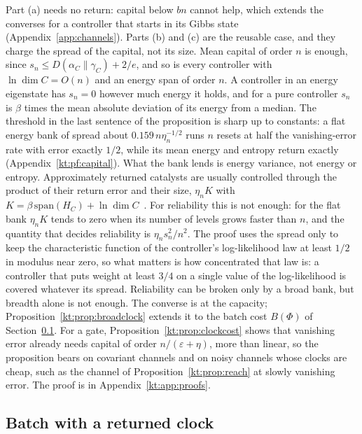 Part (a) needs no return: capital below $bn$ cannot help, which extends the converses for a controller that starts in its Gibbs state (Appendix~\ref{app:channels}). Parts (b) and (c) are the reusable case, and they charge the spread of the capital, not its size. Mean capital of order $n$ is enough, since $s_n\le D(\alpha_C\|\gamma_C)+2/e$, and so is every controller with $\ln\dim C=O(n)$ and an energy span of order $n$. A controller in an energy eigenstate has $s_n=0$ however much energy it holds, and for a pure controller $s_n$ is $\beta$ times the mean absolute deviation of its energy from a median. The threshold in the last sentence of the proposition is sharp up to constants: a flat energy bank of spread about $0.159\,n\eta_n^{-1/2}$ runs $n$ resets at half the vanishing-error rate with error exactly $1/2$, while its mean energy and entropy return exactly (Appendix~\ref{kt:pf:capital}). What the bank lends is energy variance, not energy or entropy. Approximately returned catalysts are usually controlled through the product of their return error and their size, $\eta_nK$ with $K=\beta\,\mathrm{span}(H_C)+\ln\dim C$~\cite{BrandaoSecondLaws15,NgCatalysis15}. For reliability this is not enough: for the flat bank $\eta_nK$ tends to zero when its number of levels grows faster than $n$, and the quantity that decides reliability is $\eta_ns_n^2/n^2$. The proof uses the spread only to keep the characteristic function of the controller's log-likelihood law at least $1/2$ in modulus near zero, so what matters is how concentrated that law is: a controller that puts weight at least $3/4$ on a single value of the log-likelihood is covered whatever its spread. Reliability can be broken only by a broad bank, but breadth alone is not enough. The converse is at the capacity; Proposition~\ref{kt:prop:broadclock} extends it to the batch cost $B(\Phi)$ of Section~\ref{kt:sec:batch}. For a gate, Proposition~\ref{kt:prop:clockcost} shows that vanishing error already needs capital of order $n/(\varepsilon+\eta)$, more than linear, so the proposition bears on covariant channels and on noisy channels whose clocks are cheap, such as the channel of Proposition~\ref{kt:prop:reach} at slowly vanishing error. The proof is in Appendix~\ref{kt:app:proofs}.

\subsection{Batch with a returned clock}\label{kt:sec:batch}

